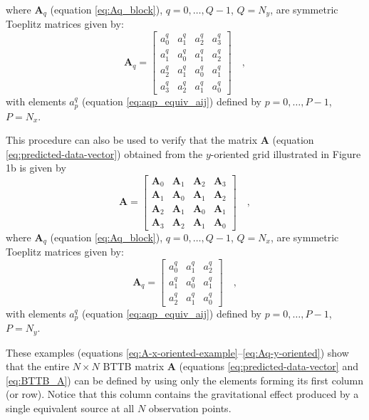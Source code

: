 \documentclass[manuscript,revised]{geophysics}
\begin{document}
where $\mathbf{A}_{q}$ (equation \ref{eq:Aq_block}), $q = 0, \dots, Q -1$, $Q = N_{y}$, 
are symmetric Toeplitz matrices given by:
\begin{equation}
\mathbf{A}_{q} = \begin{bmatrix}
a^{q}_{0} & a^{q}_{1} & a^{q}_{2} & a^{q}_{3} \\
a^{q}_{1} & a^{q}_{0} & a^{q}_{1} & a^{q}_{2} \\
a^{q}_{2} & a^{q}_{1} & a^{q}_{0} & a^{q}_{1} \\
a^{q}_{3} & a^{q}_{2} & a^{q}_{1} & a^{q}_{0}
\end{bmatrix} \quad ,
\label{eq:Aq-x-oriented}
\end{equation}
with elements $a^{q}_{p}$ (equation \ref{eq:aqp_equiv_aij}) defined by 
$p = 0, \dots, P - 1$, $P = N_{x}$.

This procedure can also be used to verify that the matrix $\mathbf{A}$ 
(equation \ref{eq:predicted-data-vector}) obtained
from the $y$-oriented grid illustrated in Figure 1b is given by
\begin{equation}
\mathbf{A} = \begin{bmatrix}
\mathbf{A}_{0} & \mathbf{A}_{1} & \mathbf{A}_{2} & \mathbf{A}_{3} \\
\mathbf{A}_{1} & \mathbf{A}_{0} & \mathbf{A}_{1} & \mathbf{A}_{2} \\
\mathbf{A}_{2} & \mathbf{A}_{1} & \mathbf{A}_{0} & \mathbf{A}_{1} \\
\mathbf{A}_{3} & \mathbf{A}_{2} & \mathbf{A}_{1} & \mathbf{A}_{0}
\end{bmatrix} \quad ,
\label{eq:A-y-oriented-example}
\end{equation}
where $\mathbf{A}_{q}$ (equation \ref{eq:Aq_block}), $q = 0, \dots, Q - 1$, $Q = N_{x}$, 
are symmetric Toeplitz matrices given by:
\begin{equation}
\mathbf{A}_{q} = \begin{bmatrix}
a^{q}_{0} & a^{q}_{1} & a^{q}_{2} \\
a^{q}_{1} & a^{q}_{0} & a^{q}_{1} \\
a^{q}_{2} & a^{q}_{1} & a^{q}_{0}
\end{bmatrix} \quad ,
\label{eq:Aq-y-oriented}
\end{equation}
with elements $a^{q}_{p}$ (equation \ref{eq:aqp_equiv_aij}) defined by 
$p = 0, \dots, P - 1$, $P = N_{y}$.

These examples (equations \ref{eq:A-x-oriented-example}--\ref{eq:Aq-y-oriented}) show 
that the entire $N \times N$ BTTB matrix $\mathbf{A}$ 
(equations \ref{eq:predicted-data-vector} and \ref{eq:BTTB_A}) 
can be defined by using only the elements 
forming its first column (or row). Notice that this column contains the gravitational effect 
produced by a single equivalent source at all $N$ observation points.
\end{document}
